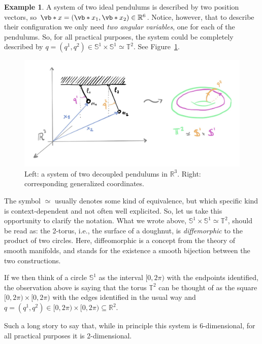 \documentclass[english,fontsize=11pt,paper=b5]{scrbook}
\theoremstyle{definition}
\newtheorem{example}{Example}[chapter]
\newcommand{\emphidx}[1]{\index{#1}\emph{#1}}
\begin{document}
  \begin{example}\label{example:gcoords}
    A system of two ideal pendulums is described by two position vectors, so $\vb*{x} = (\vb*{x}_1, \vb*{x}_2)\in\mathbb{R}^{6}$.
    Notice, however, that to describe their configuration we only need \emph{two angular variables}, one for each of the pendulums.
    So, for all practical purposes, the system could be completely described by $q = (q^1, q^2) \in \mathbb{S}^1\times\mathbb{S}^1 \simeq \mathbb{T}^2$. See Figure~\ref{fig:twopend}.

    \begin{figure}[ht!]
      \centering
      \includegraphics[width=0.9\linewidth,trim={0 1cm 0 1cm}, clip]{images/HM-1-1.pdf}
      \caption{Left: a system of two decoupled pendulums in $\mathbb{R}^3$. Right: corresponding generalized coordinates.}%
      \label{fig:twopend}
    \end{figure}

    The symbol $\simeq$ usually denotes some kind of equivalence, but which specific kind is context-dependent and not often well explicited.
    So, let us take this opportunity to clarify the notation.
    What we wrote above, $\mathbb{S}^1\times\mathbb{S}^1 \simeq \mathbb{T}^2$, should be read as: the 2-torus, i.e., the surface of a doughnut, is \emphidx{diffemorphic} to the product of two circles. Here, diffeomorphic is a concept from the theory of smooth manifolds, and stands for the existence a smooth bijection between the two constructions.

    If we then think of a circle $\mathbb{S}^1$ as the interval $[0, 2\pi)$ with the endpoints identified, the observation above is saying that the torus $\mathbb{T}^2$ can be thought of as the square $[0, 2\pi)\times[0, 2\pi)$ with the edges identified in the usual way and $q = (q^1, q^2) \in [0, 2\pi)\times[0, 2\pi) \subseteq \mathbb{R}^2$.

    Such a long story to say that, while in principle this system is 6-dimensional, for all practical purposes it is 2-dimensional.
  \end{example}
\end{document}
